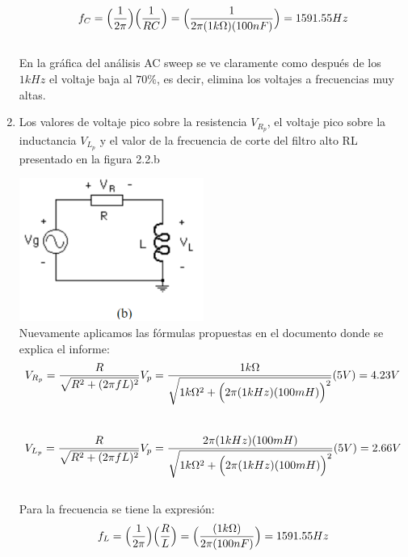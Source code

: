 \documentclass[12pt]{article}
\begin{document}
\begin{enumerate}
		\begin{equation}
			\notag f_C = \Big(\frac{1}{2\pi}\Big)\Big(\frac{1}{RC}\Big) = \Big(\frac{1}{2\pi (1k\Omega)(100nF)}\Big) = 1591.55Hz
		\end{equation}\\
		
		\noindent En la gráfica del análisis AC sweep se ve claramente como después de los $1kHz$ el voltaje baja al $70\%$, es decir, elimina los voltajes a frecuencias muy altas.\\
		
		\item Los valores de voltaje pico sobre la resistencia $V_{R_p}$, el voltaje pico sobre la inductancia $V_{L_p}$ y el valor de la frecuencia de corte del filtro alto RL presentado en la figura 2.2.b
		
		\includegraphics{Img/2_2_b}\\
		
		\noindent Nuevamente aplicamos las fórmulas propuestas en el documento donde se explica el informe:\\
		
		\begin{equation}
			\notag V_{R_p} = \frac{R}{\sqrt{R^2 + (2\pi f L)^2}}V_p = \frac{1k\Omega}{\sqrt{1k\Omega ^2 + \Big (2\pi (1kHz) (100mH)\Big)^2}}(5V) = 4.23V
		\end{equation}\\
	
		\begin{equation}
			\notag V_{L_p} = \frac{R}{\sqrt{R^2 + (2\pi f L)^2}}V_p = \frac{2\pi (1kHz) (100mH)}{\sqrt{1k\Omega ^2 + \Big (2\pi (1kHz) (100mH)\Big)^2}}(5V) = 2.66V
		\end{equation}\\
	
		\noindent Para la frecuencia se tiene la expresión:\\
		
		\begin{equation}
			\notag f_L = \Big(\frac{1}{2\pi}\Big)\Big(\frac{R}{L}\Big) = \Big(\frac{(1k\Omega)}{2\pi (100nF)}\Big) = 1591.55Hz
		\end{equation}\\
	

\end{enumerate}
\end{document}
